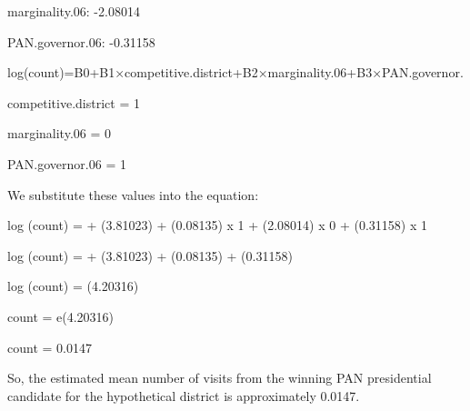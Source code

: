 \documentclass[12pt,letterpaper]{article}
\begin{document}
\begin{enumerate}
marginality.06: -2.08014

PAN.governor.06: -0.31158

log(count)=B0+B1×competitive.district+B2×marginality.06+B3×PAN.governor.

competitive.district = 1

marginality.06 = 0

PAN.governor.06 = 1

We substitute these values into the equation: 

log (count) = + (3.81023) + (0.08135) x 1 + (2.08014) x 0 + (0.31158) x 1

log (count) = + (3.81023) + (0.08135) + (0.31158)

log (count) = (4.20316)

count = e(4.20316)

count = 0.0147

So, the estimated mean number of visits from the winning PAN presidential candidate for the hypothetical district is approximately 0.0147.

\end{enumerate}
\end{document}
